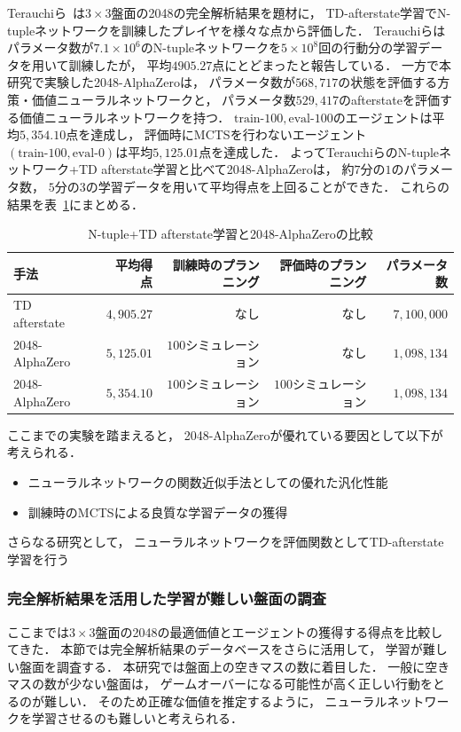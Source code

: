 Terauchiら~\cite{Min2048_matsuzaki}は$3\times3$盤面の2048の完全解析結果を題材に， TD-afterstate学習でN-tupleネットワークを訓練したプレイヤを様々な点から評価した．
Terauchiらはパラメータ数が$7.1\times{10}^6$のN-tupleネットワークを$5 \times {10}^8$回の行動分の学習データを用いて訓練したが， 平均$4905.27$点にとどまったと報告している．
一方で本研究で実験した2048-AlphaZeroは， パラメータ数が$568,717$の状態を評価する方策・価値ニューラルネットワークと， パラメータ数$529,417$のafterstateを評価する価値ニューラルネットワークを持つ．
$\text{train-}100,\text{eval-}100$のエージェントは平均$5,354.10$点を達成し， 評価時にMCTSを行わないエージェント$(\text{train-}100,\text{eval-}0)$は平均$5,125.01$点を達成した．
よってTerauchiらのN-tupleネットワーク+TD afterstate学習と比べて2048-AlphaZeroは， 約$7$分の$1$のパラメータ数， $5$分の$3$の学習データを用いて平均得点を上回ることができた．
これらの結果を表~\ref{table:terauchi}にまとめる．
\begin{table}[t]
    \centering
    \begin{tabular}{lrrrr}
        \hline \hline
        手法 & 平均得点 & 訓練時のプランニング & 評価時のプランニング & パラメータ数\\ \hline
        TD afterstate~\cite{Min2048_matsuzaki} & $4,905.27$ & なし & なし & $7,100,000$\\
        2048-AlphaZero & $5,125.01$ & $100$シミュレーション & なし & $1,098,134$\\
        2048-AlphaZero & $5,354.10$ & $100$シミュレーション & $100$シミュレーション & $1,098,134$ \\
        \hline
    \end{tabular}
    \caption{N-tuple+TD afterstate学習と2048-AlphaZeroの比較}
    \label{table:terauchi}
\end{table}

ここまでの実験を踏まえると， 2048-AlphaZeroが優れている要因として以下が考えられる．
\begin{itemize}
    \item ニューラルネットワークの関数近似手法としての優れた汎化性能
    \item 訓練時のMCTSによる良質な学習データの獲得
\end{itemize}
さらなる研究として， ニューラルネットワークを評価関数としてTD-afterstate学習を行う

\subsubsection{完全解析結果を活用した学習が難しい盤面の調査}
\label{subsubsec:db_analize}
ここまでは$3\times3$盤面の2048の最適価値とエージェントの獲得する得点を比較してきた．
本節では完全解析結果のデータベースをさらに活用して， 学習が難しい盤面を調査する．
本研究では盤面上の空きマスの数に着目した．
一般に空きマスの数が少ない盤面は， ゲームオーバーになる可能性が高く正しい行動をとるのが難しい．
そのため正確な価値を推定するように， ニューラルネットワークを学習させるのも難しいと考えられる．

